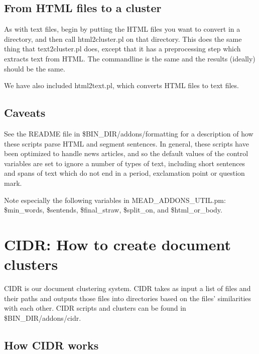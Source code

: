 \documentclass[10pt]{article}
\begin{document}
\subsection{From HTML files to a cluster}
As with text files, begin by putting the HTML files you want to convert in 
a directory, and then call html2cluster.pl on that directory.   
This does the same thing that text2cluster.pl does, except that 
it has a preprocessing step which extracts text from HTML.  The commandline is the same 
and the results (ideally) should be the same.

We have also included html2text.pl, which converts HTML files to text files.

\subsection{Caveats}
See the README file in \$BIN\_DIR/addons/formatting 
for a description of how these scripts parse HTML and 
segment sentences.  In general, these scripts have been optimized to 
handle news articles, and so the default values of the control variables
are set to ignore a number of types of text, including short sentences and spans of text 
which do not end in a period, exclamation point or question mark.

Note especially the following variables in MEAD\_ADDONS\_UTIL.pm: \$min\_words, 
\$sentends, 
\$final\_straw, \$split\_on, and \$html\_or\_body.

\section{CIDR: How to create document clusters}
CIDR is our document clustering system.  CIDR takes as input a list of 
files and their paths and outputs those files into directories based on the 
files' similarities with each other.    
CIDR scripts and clusters can be found in \$BIN\_DIR/addons/cidr.

\subsection{How CIDR works}
\end{document}
